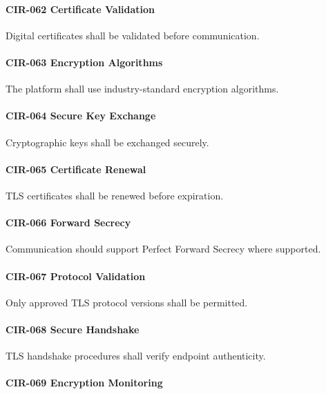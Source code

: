 \paragraph{CIR-062 Certificate Validation}

Digital certificates shall be validated before communication.

\paragraph{CIR-063 Encryption Algorithms}

The platform shall use industry-standard encryption algorithms.

\paragraph{CIR-064 Secure Key Exchange}

Cryptographic keys shall be exchanged securely.

\paragraph{CIR-065 Certificate Renewal}

TLS certificates shall be renewed before expiration.

\paragraph{CIR-066 Forward Secrecy}

Communication should support Perfect Forward Secrecy where supported.

\paragraph{CIR-067 Protocol Validation}

Only approved TLS protocol versions shall be permitted.

\paragraph{CIR-068 Secure Handshake}

TLS handshake procedures shall verify endpoint authenticity.

\paragraph{CIR-069 Encryption Monitoring}

